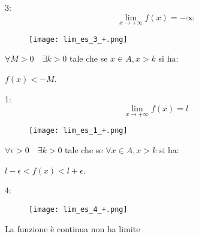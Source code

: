 \documentclass[../main.tex, class=article, 12pt]{subfiles}
\begin{document}
\begin{exmp}
        3:
        \begin{equation*}
                \lim_{x \to +\infty} f(x) = -\infty
        \end{equation*}
        \begin{figure}[H]
          	\texttt{[image: lim\_es\_3\_+.png]}
          	\caption{}
        \end{figure}
         
        $ \forall M > 0 \quad  \exists k > 0$  tale che se $ x \in A, x > k $ si ha:\par $\boxed{f(x) < -M}$. \par

\end{exmp}
\begin{exmp}
        1:
        \begin{equation*}
                \lim_{x \to +\infty} f(x) = l 
        \end{equation*}
        \begin{figure}[h]
          	\texttt{[image: lim\_es\_1\_+.png]}
          	\caption{}
        \end{figure}
        
        $ \forall \epsilon > 0 \quad  \exists k > 0$  tale che se $\forall x \in A, x > k $ si ha:\par $\boxed{l-\epsilon<f(x) < l+\epsilon} $. \par
\end{exmp}

\begin{exmp}
        4:
        \begin{figure}[H]
          	\texttt{[image: lim\_es\_4\_+.png]}
          	\caption{}
        \end{figure}
        La funzione è continua non ha limite
\end{exmp}
\end{document}
